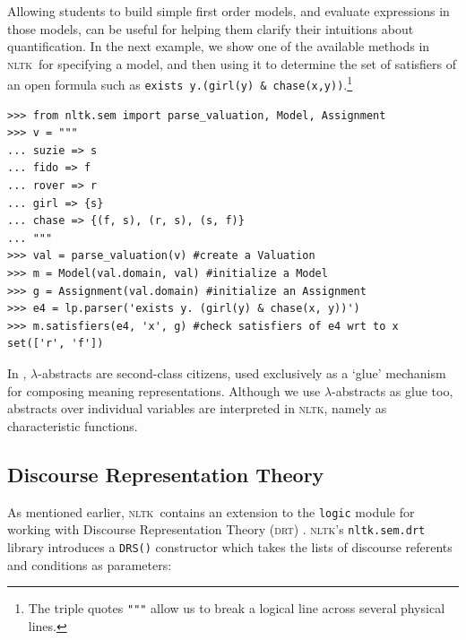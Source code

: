 \documentclass[11pt,a4paper]{article}
\newcommand{\DRT}{\textsc{drt}}
\newcommand{\NLTK}{\textsc{nltk}}
\newcommand{\dhgcode}[1]{{\tt #1}}
\begin{document}


Allowing students to build simple first order models, and evaluate
expressions in those models, can be useful for helping them clarify
their intuitions about quantification. In the next example, we show
one of the available methods in \NLTK\ for specifying a model, and
then using it to determine the set of satisfiers of an open formula
such as \verb!exists y.(girl(y) & chase(x,y))!.\footnote{The triple
  quotes \texttt{"""} allow us to break a logical line across several physical
  lines.}
\begin{verbatim}
>>> from nltk.sem import parse_valuation, Model, Assignment
>>> v = """
... suzie => s
... fido => f
... rover => r
... girl => {s}
... chase => {(f, s), (r, s), (s, f)}
... """
>>> val = parse_valuation(v) #create a Valuation
>>> m = Model(val.domain, val) #initialize a Model
>>> g = Assignment(val.domain) #initialize an Assignment
>>> e4 = lp.parser('exists y. (girl(y) & chase(x, y))')
>>> m.satisfiers(e4, 'x', g) #check satisfiers of e4 wrt to x
set(['r', 'f'])
\end{verbatim}

In \citet{BB}, $\lambda$-abstracts are second-class citizens, used
exclusively as a `glue' mechanism for composing meaning
representations. Although we use $\lambda$-abstracts as glue too,
abstracts over individual variables are interpreted in \NLTK, namely as
characteristic functions.

\subsection{Discourse Representation Theory}
As mentioned earlier, \NLTK\ contains an extension to the
\dhgcode{logic} module for working with Discourse Representation
Theory (\DRT) \citep{KampReyle}.  \NLTK's \dhgcode{nltk.sem.drt}
library introduces a \texttt{DRS()} constructor which takes the lists
of discourse referents and conditions as parameters:
\enumsentence{\label{drt3} \dhgcode{DRS([j, d],[(John = j), dog(d),
    sees(j, d)])}} 
\end{document}
